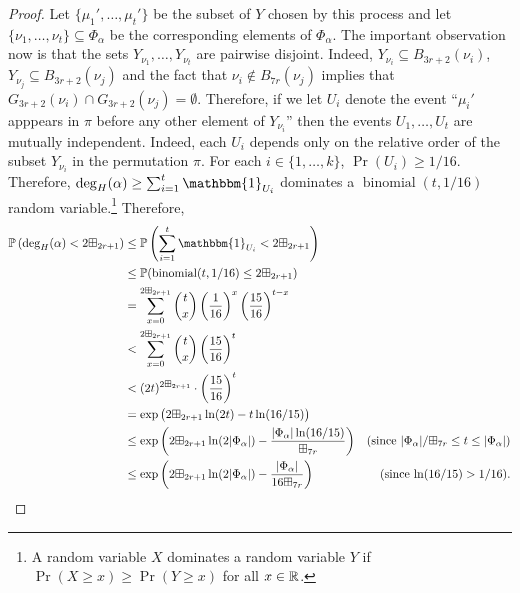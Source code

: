 \documentclass{patmorin}
\newcommand{\vol}[1]{\boxplus_{#1}}
\DeclareMathOperator{\binomial}{binomial}
\begin{document}
\begin{proof}
  Let $\{\mu_1',\ldots,\mu_t'\}$ be the subset of $Y$ chosen by this process and let $\{\nu_1,\ldots,\nu_t\}\subseteq\Phi_\alpha$ be the corresponding elements of $\Phi_\alpha$.  The important observation now is that the sets $Y_{\nu_1},\ldots,Y_{\nu_t}$ are pairwise disjoint.  Indeed, $Y_{\nu_i}\subseteq B_{3r+2}(\nu_i)$, $Y_{\nu_j}\subseteq B_{3r+2}(\nu_j)$ and the fact that $\nu_i\not\in B_{7r}(\nu_j)$ implies that $G_{3r+2}(\nu_i)\cap G_{3r+2}(\nu_j)=\emptyset$.  Therefore, if we let $U_i$ denote the event ``$\mu_i'$ apppears in $\pi$ before any other element of $Y_{\nu_i}$'' then the events $U_1,\ldots,U_t$ are mutually independent.  Indeed, each $U_i$ depends only on the relative order of the subset $Y_{\nu_i}$ in the permutation $\pi$.  For each $i\in\{1,\ldots,k\}$, $\Pr(U_i)\ge 1/16$.  Therefore, $\deg_H(\alpha)\ge \sum_{i=1}^t \mathbbm{1}_{U_i}$ dominates a $\binomial(t,1/16)$ random variable.\footnote{A random variable $X$ dominates a random variable $Y$ if $\Pr(X\ge x)\ge \Pr(Y\ge x)$ for all $x\in\mathbb{R}$.}  Therefore,
  \begin{align}
    \Pr\left(\deg_H(\alpha)< 2\vol{2r+1}\right)
    & \le \Pr\left(\sum_{i=1}^t \mathbbm{1}_{U_i} < 2\vol{2r+1}\right) \notag \\
    & \le \Pr(\binomial(t,1/16)\le 2\vol{2r+1}) \notag \\
    & = \sum_{x=0}^{2\vol{2r+1}} \binom{t}{x}\left(\frac{1}{16}\right)^x\left(\frac{15}{16}\right)^{t-x} \notag \\
    & < \sum_{x=0}^{2\vol{2r+1}} \binom{t}{x}\left(\frac{15}{16}\right)^{t} \notag \\
    & < (2t)^{2\vol{2r+1}}\cdot\left(\frac{15}{16}\right)^{t} \notag \\
    & = \exp\big({2\vol{2r+1}}\ln(2t)-t\ln(16/15)\big) \notag \\
    & \le \exp\left({2\vol{2r+1}}\ln(2|\Phi_\alpha|)-\frac{|\Phi_\alpha|\ln(16/15)}{\vol{7r}}\right)
      & \text{(since $|\Phi_\alpha|/\vol{7r} \le t \le |\Phi_\alpha|$)} \notag \\
    & \le \exp\left({2\vol{2r+1}}\ln(2|\Phi_\alpha|)-\frac{|\Phi_\alpha|}{16\vol{7r}}\right)
      & \text{(since $\ln(16/15) > 1/16$).}
       \label{probability}
  \end{align}



\end{proof}
\end{document}
